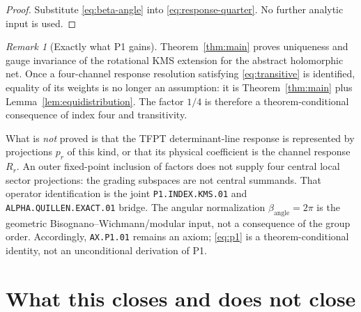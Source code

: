 \documentclass[11pt]{article}
\theoremstyle{remark}
\newtheorem{remark}[theorem]{Remark}
\begin{document}
\begin{proof}
Substitute \eqref{eq:beta-angle} into
\eqref{eq:response-quarter}.  No further analytic input is used.
\end{proof}

\begin{remark}[Exactly what P1 gains]
Theorem~\ref{thm:main} proves uniqueness and gauge invariance of the
rotational KMS extension for the abstract holomorphic net.  Once a
four-channel response resolution satisfying
\eqref{eq:transitive} is identified, equality of its weights is no
longer an assumption: it is Theorem~\ref{thm:main} plus
Lemma~\ref{lem:equidistribution}.  The factor $1/4$ is therefore a
theorem-conditional consequence of index four and transitivity.

What is \emph{not} proved is that the TFPT determinant-line response
is represented by projections $p_r$ of this kind, or that its
physical coefficient is the channel response $R_r$.  An outer
fixed-point inclusion of factors does not supply four central local
sector projections: the grading subspaces are not central summands.
That operator identification is the joint
\texttt{P1.INDEX.KMS.01} and
\texttt{ALPHA.QUILLEN.EXACT.01} bridge.
The angular normalization $\beta_{\mathrm{angle}}=2\pi$ is the
geometric Bisognano--Wichmann/modular input, not a consequence of
the group order.  Accordingly, \texttt{AX.P1.01} remains an axiom;
\eqref{eq:p1} is a theorem-conditional identity, not an unconditional
derivation of P1.
\end{remark}

\section{What this closes and does not close}
\end{document}
